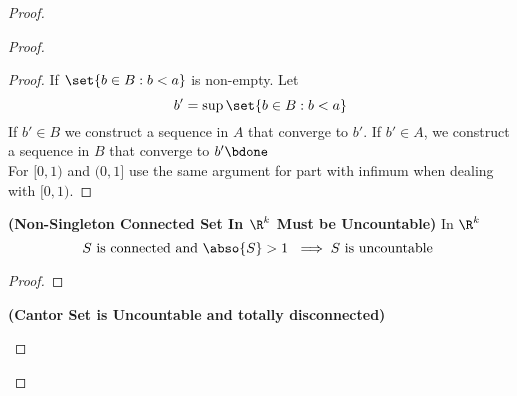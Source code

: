 \documentclass{report}
\begin{document}
\begin{proof}
\begin{proof}
\begin{proof}
If $\set{b\in B:b<a}$ is non-empty. Let
\begin{equation*}
b'=\sup \set{b\in B:b<a}
\end{equation*}
If $b'\in B$ we construct a sequence in $A$ that converge to  $b'$. If  $b'\in A$, we construct a sequence in $B$ that converge to  $b'\bdone$\\

For $[0,1)$ and $(0,1]$ use the same argument for  part with infimum when dealing with $[0,1)$.
\end{proof}
\begin{theorem}
\label{3.4.2}
\textbf{(Non-Singleton Connected Set In $\R^k$ Must be Uncountable)} In $\R^k$
\begin{equation*}
  S\text{ is connected and $\abso{S}>1$ }\implies S\text{ is uncountable }
\end{equation*}
\end{theorem}
\begin{proof}

\end{proof}
\begin{theorem}
\label{3.4.3}
\textbf{(Cantor Set is Uncountable and totally disconnected)}
\end{theorem}

\end{proof}
\end{proof}
\end{document}
